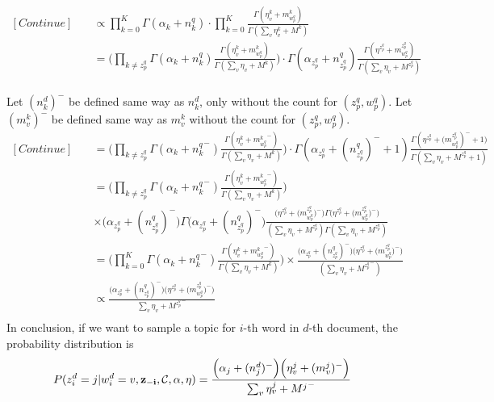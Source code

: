 \documentclass[11pt]{article}
\begin{document}
\begin{spacing}{1.6}
\begin{equation}
\begin{split}
[Continue] \quad & \propto \prod_{k=0}^{K} \Gamma (\alpha_k+n^q_k) \cdot \prod_{k=0}^{K}\frac{ \Gamma (\eta^k_v+m^k_{w^q_p}) }{\Gamma ({\sum_{v}\eta^k_v}+M^k)}\\[15pt]
& = \bigg( \prod_{k \neq {z^q_p}} \Gamma (\alpha_k+n^q_k) \frac{ \Gamma (\eta^k_v+m^k_{w^q_p}) }{\Gamma ({\sum_{v}\eta_v}+M^k)} \bigg) \cdot \Gamma (\alpha_{z^q_p}+n^q_{z^q_p}) \frac{ \Gamma (\eta^{z^q_p}+m^{z^q_p}_{w^q_p}) }{\Gamma ({\sum_{v}\eta_v}+M^{z^q_p})}\\[15pt]
\
\end{split}
\end{equation}

\noindent Let $(n^d_k)^-$ be defined same way as $n^d_k$, only without the count for $(z^q_p, w^q_p)$. Let $(m^k_v)^-$ be defined same way as $m^k_v$ without the count for $(z^q_p, w^q_p)$. \\
\begin{equation} \label{eq2}
\begin{split}
[Continue] \quad & =\bigg( \prod_{k \neq {z^q_p}} \Gamma (\alpha_k+{n^q_k}^{-}) \frac{ \Gamma (\eta^k_v+{m^k_{w^q_p}}^{-}) }{\Gamma ({\sum_{v}\eta_v}+M^k)} \bigg) \cdot \Gamma (\alpha_{z^q_p}+{({n^q_{z^q_p}})^-}+1) \frac{ \Gamma (\eta^{z^q_p}+{(m^{z^q_p}_{w^q_p}})^{-}+1) }{\Gamma ({\sum_{v}\eta_v}+M^{z^q_p}+1)}\\[15pt]
& = \bigg( \prod_{k \neq {z^q_p}} \Gamma (\alpha_k+{n^q_k}^{-}) \frac{ \Gamma (\eta^k_v+{m^k_{w^q_p}}^{-}) }{\Gamma ({\sum_{v}\eta_v}+M^k)} \bigg)\\
& \times \Big( \alpha_{z^q_p}+{({n^q_{z^q_p}})^-}\Big) \Gamma \Big( \alpha_{z^q_p}+{({n^q_{z^q_p}})^-}\Big) \frac{  \Big( \eta^{z^q_p}+{(m^{z^q_p}_{w^q_p}})^{-} \Big)  \Gamma \Big( \eta^{z^q_p}+{(m^{z^q_p}_{w^q_p}})^{-}\Big) }{ ({\sum_{v}\eta_v}+M^{z^q_p}) \Gamma ({\sum_{v}\eta_v}+M^{z^q_p}) }\\[15pt]
& =  \bigg( \prod_{k=0}^{K} \Gamma (\alpha_k+{n^q_k}^{-}) \frac{ \Gamma (\eta^k_v+{m^k_{w^q_p}}^{-}) }{\Gamma ({\sum_{v}\eta_v}+M^k)} \bigg) \times \frac{\Big( \alpha_{z^q_p}+{({n^q_{z^q_p}})^-}\Big) \Big( \eta^{z^q_p}+{(m^{z^q_p}_{w^q_p}})^{-} \Big) }{({\sum_{v}\eta_v}+{M^{z^q_p}}^{-})}\\[15pt]
& \propto \frac{\Big( \alpha_{z^q_p}+{({n^q_{z^q_p}})^-}\Big) \Big( \eta^{z^q_p}+{(m^{z^q_p}_{w^q_p}})^{-} \Big) }{{\sum_{v}\eta_v}+{M^{z^q_p}}^{-}}\\
\
\end{split}
\end{equation}
\noindent In conclusion, if we want to sample a topic for $i$-th word in $d$-th document, the probability distribution is\\
\begin{equation} \label{eq2}
\begin{split}
P({z^d_i}=j | {w^d_i}=v, {\bf{z}_{-i}},\mathcal{C},\alpha,\eta) & = \frac{\Big( \alpha_{j}+{({n^d_{j}})^-}\Big) \Big( \eta^{j}_v+{(m^{j}_{v}})^{-} \Big) }{{\sum_{v}\eta^{j}_v}+{M^{j}}^{-}}
\
\end{split}
\end{equation}

\end{spacing}
\end{document}
